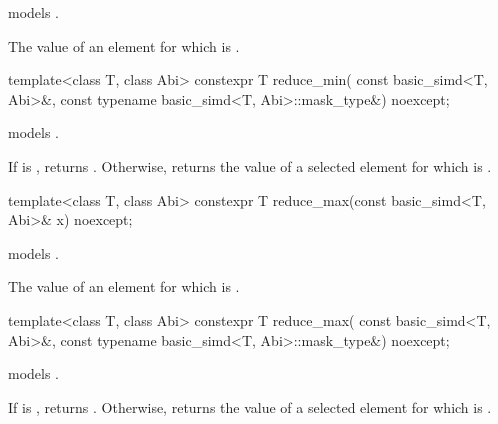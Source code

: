 \begin{itemdescr}
  \pnum\constraints
   models .

  \pnum\returns
  The value of an element  for which  is 
  .
\end{itemdescr}

\begin{itemdecl}
template<class T, class Abi>
  constexpr T reduce_min(
    const basic_simd<T, Abi>&, const typename basic_simd<T, Abi>::mask_type&) noexcept;
\end{itemdecl}

\begin{itemdescr}
  \pnum\constraints
   models .

  \pnum\returns
  If  is , returns .
  Otherwise, returns the value of a selected element  for which  is  \forallmaskedi.
\end{itemdescr}

\begin{itemdecl}
template<class T, class Abi> constexpr T reduce_max(const basic_simd<T, Abi>& x) noexcept;
\end{itemdecl}

\begin{itemdescr}
  \pnum\constraints
   models .

  \pnum\returns
  The value of an element  for which  is 
  .
\end{itemdescr}

\begin{itemdecl}
template<class T, class Abi>
  constexpr T reduce_max(
    const basic_simd<T, Abi>&, const typename basic_simd<T, Abi>::mask_type&) noexcept;
\end{itemdecl}

\begin{itemdescr}
  \pnum\constraints
   models .

  \pnum\returns
  If  is , returns .
  Otherwise, returns the value of a selected element  for which  is  \forallmaskedi.
\end{itemdescr}

